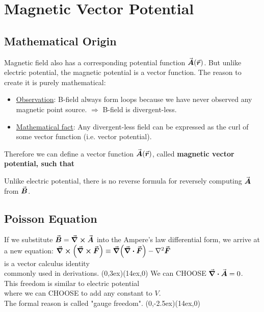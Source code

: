 \documentclass[class=article, crop=false, 12pt]{standalone}
\begin{document}
\linesep
\section{Magnetic Vector Potential}

\subsection{Mathematical Origin}

Magnetic field also has a corresponding potential function $\va*{A}(\va*{r})$.
But unlike electric potential,
the magnetic potential is a vector function. 
The reason to create it is purely mathematical:
\begin{itemize}
    \item \ul{Observation}: 
    B-field always form loops because we have never observed any magnetic point source.
    $\Rightarrow$ B-field is divergent-less.

    \item \ul{Mathematical fact}: 
    Any divergent-less field can be expressed as the curl of some vector function (i.e. vector potential).
\end{itemize}

Therefore we can define a vector function $\va*{A}(\va*{r})$,
called \bf{magnetic vector potential}, such that 

Unlike electric potential,
there is no reverse formula for reversely computing $\va*{A}$ from $\va*{B}$.

\subsection{Poisson Equation}

If we substitute $\va*{B} = \curl \va*{A}$ into the Ampere's law differential form,
we arrive at a new equation: 
{\scriptsize $\curl(\curl \vvec{F}) \equiv \grad(\div \vvec{F}) - \laplacian \vvec{F}$\\[-0.5ex]\scriptsize is a vector calculus identity\\[-1ex]\scriptsize commonly used in derivations.}
{(0,3ex)}{(14ex,0)}
{\scriptsize We can CHOOSE $\div \va*{A}=0$.\\[-1ex]\scriptsize This freedom is similar to electric potential\\[-1ex]
    \scriptsize where we can CHOOSE to add any constant to $V$.\\[-1ex]\scriptsize The formal reason is called "gauge freedom".}
{(0,-2.5ex)}{(14ex,0)}
\end{document}
